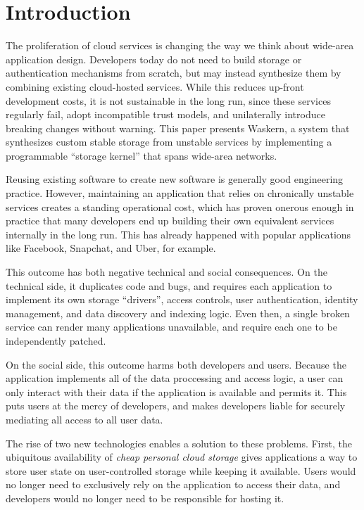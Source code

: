 \section{Introduction}
\label{sec:introduction}

The proliferation of cloud services is changing the way we think about
wide-area application design.  Developers today do not need to build storage
or authentication mechanisms from scratch, but may instead synthesize them by
combining existing cloud-hosted services.  While this reduces up-front
development costs, it is not sustainable in the long run,
since these services regularly fail, adopt incompatible trust models, and
unilaterally introduce breaking changes without warning.  This paper
presents Waskern, a system that synthesizes custom stable storage
from unstable services by implementing a programmable ``storage kernel'' that spans
wide-area networks.

Reusing existing software to create new software is generally good engineering practice.
However, maintaining an application that relies on chronically unstable services
creates a standing operational cost, which has proven onerous enough in practice that
many developers end up building their own equivalent services internally in the
long run.  This has already happened with popular applications
like Facebook, Snapchat, and Uber, for example.

This outcome has both negative technical and social consequences.  On the
technical side, it duplicates code and bugs, and requires each application to
implement its own storage ``drivers'', access controls, user authentication,
identity management, and data discovery and indexing logic.  Even then, a single
broken service can render many applications unavailable, and require each one
to be independently patched.

On the social side, this outcome harms both developers and users.  Because the
application implements all of the data proccessing and access logic, a user can
only interact with their data if the application is available and permits it.  This puts users at
the mercy of developers, and makes developers liable for securely mediating all access
to all user data.

The rise of two new technologies enables a solution to these problems.  First, the
ubiquitous availability of \textit{cheap personal cloud storage} gives
applications a way to store user state on user-controlled storage while keeping
it available.  Users would no longer need to exclusively rely on the application to access their data,
and developers would no longer need to be responsible for hosting it.

